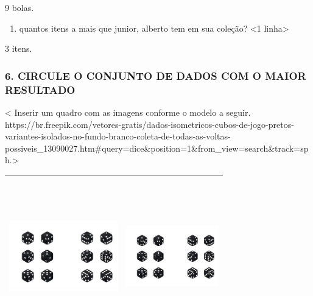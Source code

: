 9 bolas.

\begin{enumerate}
\def\labelenumi{\Alph{enumi})}
\item
  quantos itens a mais que junior, alberto tem em sua coleção?
  \textless{}1 linha\textgreater{}
\end{enumerate}

3 itens.

\subsubsection{6. CIRCULE O CONJUNTO DE DADOS COM O MAIOR
RESULTADO}\label{circule-o-conjunto-de-dados-com-o-maior-resultado}

\textless{} Inserir um quadro com as imagens conforme o modelo a seguir.
https://br.freepik.com/vetores-gratis/dados-isometricos-cubos-de-jogo-pretos-variantes-isolados-no-fundo-branco-coleta-de-todas-as-voltas-possiveis\_13090027.htm\#query=dice\&position=1\&from\_view=search\&track=sph.\textgreater{}

\begin{longtable}[]{@{}ll@{}}
\toprule
\includegraphics[width=1.85846in,height=2.68750in]{media/image7.jpg} &
\includegraphics[width=1.57843in,height=2.68750in]{media/image7.jpg}\tabularnewline
\bottomrule
\end{longtable}

